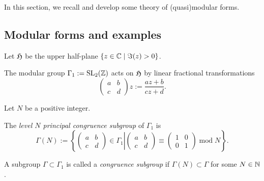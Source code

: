 
In this section, we recall and develop some theory of (quasi)modular forms.

\subsection{Modular forms and examples}

Let $\mathfrak{H}$ be the upper half-plane $\{z\in\mathbb{C}\mid\Im(z)>0\}$.
\begin{lemma}\label{def:Gamma-1-Action}\leanok
    The modular group $\Gamma_1:=\mathrm{SL}_2(\mathbb{Z})$ acts on $\mathfrak{H}$ by linear fractional transformations
$$\left(\begin{smallmatrix}a&b\\c&d\end{smallmatrix}\right)z:=\frac{az+b}{cz+d}.$$
\end{lemma}

Let $N$ be a positive integer.
\begin{definition}\label{def:level-N-princ-cong-subgp}
    The \emph{level $N$ principal congruence subgroup} of $\Gamma_1$ is
    $$\Gamma(N):=\left\{\left.\left(\begin{smallmatrix}a&b\\c&d\end{smallmatrix}\right)\in\Gamma_1\right|\left(\begin{smallmatrix}a&b\\c&d\end{smallmatrix}\right)\equiv\left(\begin{smallmatrix}1&0\\0&1\end{smallmatrix}\right)\;\mathrm{mod}\;N\right\}.$$
\end{definition}

\begin{definition}\label{def:congruence-subgroup}\leanok
    A subgroup $\Gamma\subset\Gamma_1$ is called a \emph{congruence subgroup} if $\Gamma(N)\subset\Gamma$ for some $N\in\mathbb{N}$.
\end{definition}


